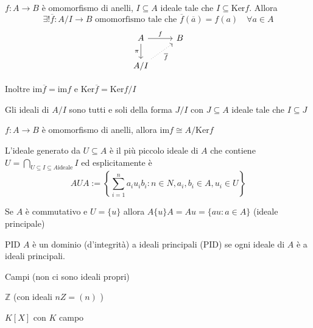 \begin{theorem}[Omomorfismo]
    \(f : A\to B\) è omomorfismo di anelli, \(I \subseteq A \) ideale tale che
    \(I \subseteq \mathrm{Ker}f \). Allora
    \[
      \exists ! \overline{f} : A / I \to  B \text{ omomorfismo tale che } \overline{f}{(\overline{a})} = f{(a)} \quad \forall  a \in A
    \]
\[\begin{tikzcd}
	A & B \\
	{A / I}
	\arrow["f", from=1-1, to=1-2]
	\arrow["\pi"', from=1-1, to=2-1]
	\arrow["{\overline{f}}"', dotted, from=2-1, to=1-2]
\end{tikzcd}\]

Inoltre \(\mathrm{im}\overline{f} = \mathrm{im}f\) e \(\mathrm{Ker}\overline{f} = \mathrm{Ker} f / I\) 
\end{theorem}
\begin{proposition}{}
    Gli ideali di \(A / I\) sono tutti e soli della forma \(J / I\) con \(J \subseteq A \) ideale tale che \(I \subseteq J \) 
\end{proposition}


\begin{theorem}
    \(f : A \to B\) è omomorfismo di anelli, allora \(\mathrm{im}f \cong A / \mathrm{Ker}f\)  
\end{theorem}

\begin{definition}{}
    L'ideale generato da \(U \subseteq A \) è il più piccolo ideale di \(A\) che
    contiene \(U = \bigcap_{U \subseteq I \subseteq A \text{ideale}} I \) ed
    esplicitamente è 
    \[
      A U A := \left\{\sum_{i=1}^{n} a_{i} u_{i} b_{i} : n \in N, a_{i}, b_{i} \in A, u_{i} \in U \right\} 
    \]
\end{definition}
\begin{remark}{}
    Se \(A\) è commutativo e \(U = \{u\} \) allora \(A \{ u \} A = Au = \{au : a
    \in A\} \) (ideale principale)
\end{remark}
\begin{definition}{PID}
    \(A\) è un dominio (d'integrità) a ideali principali (PID) se ogni ideale di
    \(A\) è a ideali principali.
\end{definition}
\begin{example}{}
    Campi (non ci sono ideali propri)
\end{example}
\begin{example}{}
    \(\mathbb{Z}\) (con ideali \(nZ = (n)\) )
\end{example}
\begin{example}{}
    \(K[X]\) con \(K\) campo
\end{example}


